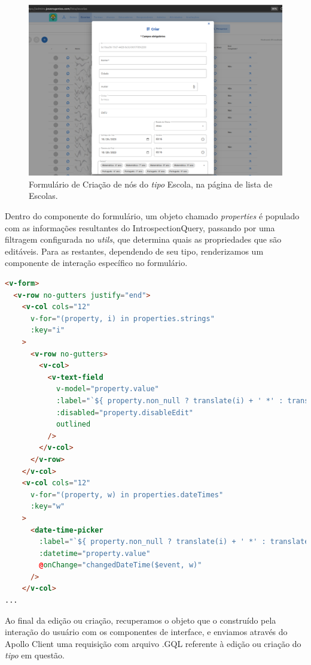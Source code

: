\begin{figure}
    \centering
    \includegraphics[width=1\linewidth]{Imagens/chap04/front-reusable-form.png}
    \caption{Formulário de Criação de nós do \textit{tipo} Escola, na página de lista de Escolas.}
    \label{fig:front-reusable-form}
\end{figure}


Dentro do componente do formulário, um objeto chamado \textit{properties} é populado com as informações resultantes do IntrospectionQuery, passando por uma filtragem configurada no \textit{utils}, que determina quais as propriedades que são editáveis.
Para as restantes, dependendo de seu tipo, renderizamos um componente de interação específico no formulário.

\begin{lstlisting}[language=HTML]
<v-form>
  <v-row no-gutters justify="end">
    <v-col cols="12"
      v-for="(property, i) in properties.strings"
      :key="i"
    >
      <v-row no-gutters>
        <v-col>
          <v-text-field
            v-model="property.value"
            :label="`${ property.non_null ? translate(i) + ' *' : translate(i)}`"
            :disabled="property.disableEdit"
            outlined
          />
        </v-col>
      </v-row>
    </v-col>
    <v-col cols="12"
      v-for="(property, w) in properties.dateTimes"
      :key="w"
    >
      <date-time-picker
        :label="`${ property.non_null ? translate(i) + ' *' : translate(i)}`"
        :datetime="property.value"
        @onChange="changedDateTime($event, w)"
      />
    </v-col>
...


\end{lstlisting}

Ao final da edição ou criação, recuperamos o objeto que o construído pela interação do usuário com os componentes de interface, e enviamos através do Apollo Client uma requisição com arquivo .GQL referente à edição ou criação do \textit{tipo} em questão.

